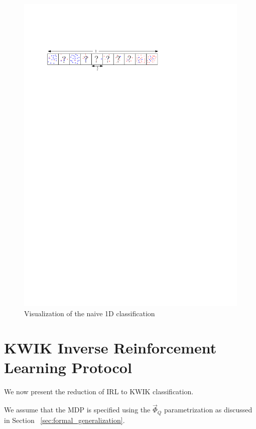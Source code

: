 \begin{figure}[H]
\centering
   \includegraphics[scale=1.5]{texs/simple_classification.pdf}
   \caption{Visualization of the naive 1D classification}
\label{fig:simple_classification}

\end{figure}






\section{KWIK Inverse Reinforcement Learning Protocol}


We now present the reduction of IRL to KWIK classification. 
\begin{assumption}
We assume that the MDP is specified using the $\vec{\Phi}_Q$ parametrization as discussed in Section ~\ref{sec:formal_generalization}. 
\end{assumption}

